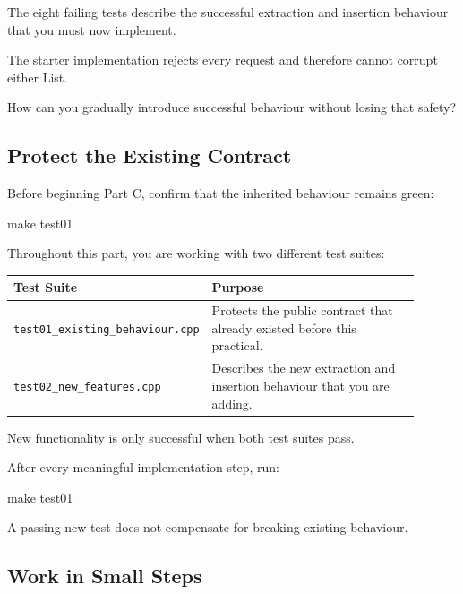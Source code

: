 \documentclass{csc2059practical}
\begin{document}
The eight failing tests describe the successful extraction and insertion behaviour that you must now implement.

\begin{engineeringquestion}
The starter implementation rejects every request and therefore cannot corrupt either List.

How can you gradually introduce successful behaviour without losing that safety?
\end{engineeringquestion}


\subsection{Protect the Existing Contract}

Before beginning Part C, confirm that the inherited behaviour remains green:

\begin{terminal}
make test01
\end{terminal}

Throughout this part, you are working with two different test suites:

\begin{center}
\begin{tabular}{p{0.32\linewidth}p{0.58\linewidth}}
\toprule
\textbf{Test Suite} & \textbf{Purpose} \\
\midrule
\texttt{test01_existing_behaviour.cpp} &
Protects the public contract that already existed before this practical. \\

\texttt{test02_new_features.cpp} &
Describes the new extraction and insertion behaviour that you are adding. \\
\bottomrule
\end{tabular}
\end{center}

\begin{importantnote}
New functionality is only successful when both test suites pass.

After every meaningful implementation step, run:

\begin{terminal}
make test01
\end{terminal}

A passing new test does not compensate for breaking existing behaviour.
\end{importantnote}


\subsection{Work in Small Steps}
\end{document}
